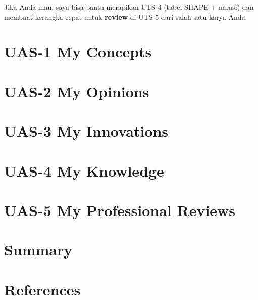 \documentclass[
  letterpaper,
  DIV=11,
  numbers=noendperiod]{scrreprt}
\begin{document}
Jika Anda mau, saya bisa bantu merapikan UTS-4 (tabel SHAPE + narasi)
dan membuat kerangka cepat untuk \textbf{review} di UTS-5 dari salah
satu karya Anda.


\chapter{UAS-1 My Concepts}\label{uas-1-my-concepts}


\chapter{UAS-2 My Opinions}\label{uas-2-my-opinions}


\chapter{UAS-3 My Innovations}\label{uas-3-my-innovations}


\chapter{UAS-4 My Knowledge}\label{uas-4-my-knowledge}


\chapter{UAS-5 My Professional
Reviews}\label{uas-5-my-professional-reviews}


\chapter{Summary}\label{summary}


\chapter*{References}\label{references}


\label{refs}
\end{document}
